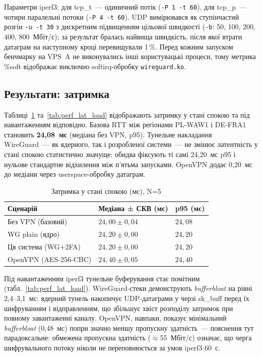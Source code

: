 Параметри iperf3: для tcp\_t~--- одиничний потік
(\texttt{-P 1 -t 60}), для tcp\_p~--- чотири паралельні потоки
(\texttt{-P 4 -t 60}). UDP вимірювався як ступінчастий розгін
\texttt{-u -t 30} з дискретним підвищенням цільової швидкості
(\texttt{-b}: 50, 100, 200, 400, 800~Мбіт/с); за результат бралась найвища
швидкість, після якої втрати датаграм на наступному кроці
перевищували 1\,\%. Перед кожним запуском бенчмарку на VPS~A не
виконувались інші користувацькі процеси, тому метрика \%soft відображає
виключно softirq-обробку \texttt{wireguard.ko}.

\subsection{Результати: затримка}
\label{subsec:perf_results_lat}

Таблиці~\ref{tab:perf_lat_idle} та~\ref{tab:perf_lat_load} відображають
затримку у стані спокою та під навантаженням відповідно. Базова RTT між
регіонами PL-WAW1 і DE-FRA1 становить \textbf{24{,}08~мс} (медіана без VPN,
p95). Тунельне накладання WireGuard~--- як ядерного, так і розробленої
системи~--- не змінює латентність у стані спокою статистично значуще: обидва
фіксують ті самі 24{,}20~мс p95 і нульове стандартне відхилення між п'ятьма
запусками. OpenVPN додає 0{,}20~мс до медіани через userspace-обробку
датаграм.

\begin{table}[htbp]\centering
\caption{Затримка у стані спокою (мс), N=5}
\label{tab:perf_lat_idle}
\begin{tabularx}{\textwidth}{|l|X|X|}\hline
\textbf{Сценарій} & \textbf{Медіана ± СКВ (мс)} & \textbf{p95 (мс)} \\\hline
Без VPN (базовий)     & $24{,}00 \pm 0{,}04$ & $24{,}08$ \\\hline
WG plain (ядро)       & $24{,}20 \pm 0{,}00$ & $24{,}20$ \\\hline
Ця система (WG+2FA)   & $24{,}20 \pm 0{,}00$ & $24{,}20$ \\\hline
OpenVPN (AES-256-CBC) & $24{,}40 \pm 0{,}05$ & $24{,}40$ \\\hline
\end{tabularx}\end{table}

Під навантаженням iperf3 тунельне буферування стає помітним (табл.~\ref{tab:perf_lat_load}).
WireGuard-стеки демонструють \textit{bufferbloat} на рівні 2{,}4--3{,}1~мс:
ядерний тунель накопичує UDP-датаграми у черзі sk\_buff перед їх шифруванням
і відправленням, що збільшує хвіст розподілу затримок при повному завантаженні
каналу. OpenVPN, навпаки, показує мінімальний \textit{bufferbloat} (0{,}48~мс) попри
значно меншу пропускну здатність~--- пояснення тут парадоксальне: обмежена
пропускна здатність ($\approx$55~Мбіт/с) означає, що черга шифрувального потоку
ніколи не переповнюється за умов iperf3 60~с.

